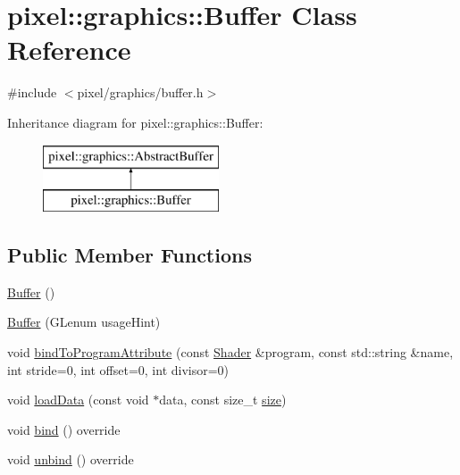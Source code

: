 \hypertarget{classpixel_1_1graphics_1_1_buffer}{}\section{pixel\+:\+:graphics\+:\+:Buffer Class Reference}
\label{classpixel_1_1graphics_1_1_buffer}


{\ttfamily \#include $<$pixel/graphics/buffer.\+h$>$}

Inheritance diagram for pixel\+:\+:graphics\+:\+:Buffer\+:\begin{figure}[H]
\begin{center}
\leavevmode
\includegraphics[height=2.000000cm]{classpixel_1_1graphics_1_1_buffer}
\end{center}
\end{figure}
\subsection*{Public Member Functions}
\begin{DoxyCompactItemize}
\item 
\hyperlink{classpixel_1_1graphics_1_1_buffer_a9fa35b1875e9c79e088587d23d6009c5}{Buffer} ()
\item 
\hyperlink{classpixel_1_1graphics_1_1_buffer_aa1c31a950ba27ec02845463158760fc1}{Buffer} (G\+Lenum usage\+Hint)
\item 
void \hyperlink{classpixel_1_1graphics_1_1_buffer_ae6521f1a22946dc2e23775cef722adca}{bind\+To\+Program\+Attribute} (const \hyperlink{classpixel_1_1graphics_1_1_shader}{Shader} \&program, const std\+::string \&name, int stride=0, int offset=0, int divisor=0)
\item 
void \hyperlink{classpixel_1_1graphics_1_1_buffer_a4454068cd191da9ff2133d22f53611fd}{load\+Data} (const void $\ast$data, const size\+\_\+t \hyperlink{namespacepixel_a465745e3b1a334686475c629948876f0}{size})
\item 
void \hyperlink{classpixel_1_1graphics_1_1_buffer_ab157f01d131d8416126607f71ab320ce}{bind} () override
\item 
void \hyperlink{classpixel_1_1graphics_1_1_buffer_ac7b3cce29e02e3ee96322fee2ed8d624}{unbind} () override
\end{DoxyCompactItemize}
